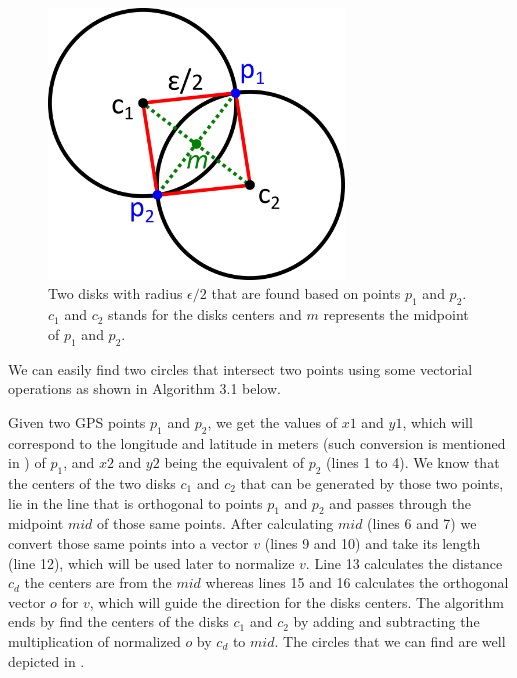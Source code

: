 \begin{figure}[h!]
    \centering
    \includegraphics[width=0.7\textwidth]{images/disks_discovery.png}
    \caption{Two disks with radius $\epsilon/2$ that are found based on points $p_1$ and $p_2$. $c_1$ and $c_2$ stands
        for the disks centers and $m$ represents the midpoint of $p_1$ and $p_2$.}
    \label{fig:disks_discovery}
\end{figure}

We can easily find two circles that intersect two points using some vectorial operations as shown in Algorithm 3.1
below.

Given two GPS points $p_1$ and $p_2$, we get the values of $x1$ and $y1$, which will correspond to the longitude and
latitude in meters (such conversion is mentioned in ) of $p_1$, and $x2$ and $y2$ being the
equivalent of $p_2$ (lines 1 to 4). We know that the centers of the two disks $c_1$ and $c_2$ that can be generated by
those two points, lie in the line that is orthogonal to points $p_1$ and $p_2$ and passes through the midpoint $mid$ of
those same points. After calculating $mid$ (lines 6 and 7) we convert those same points into a vector $v$ (lines 9 and
10) and take its length (line 12), which will be used later to normalize $v$. Line 13 calculates the distance $c_d$ the
centers are from the $mid$ whereas lines 15 and 16 calculates the orthogonal vector $o$ for $v$, which will guide the
direction for the disks centers. The algorithm ends by find the centers of the disks $c_1$ and $c_2$ by adding and
subtracting the multiplication of normalized $o$ by $c_d$ to $mid$. The circles that we can find are well depicted in
.

